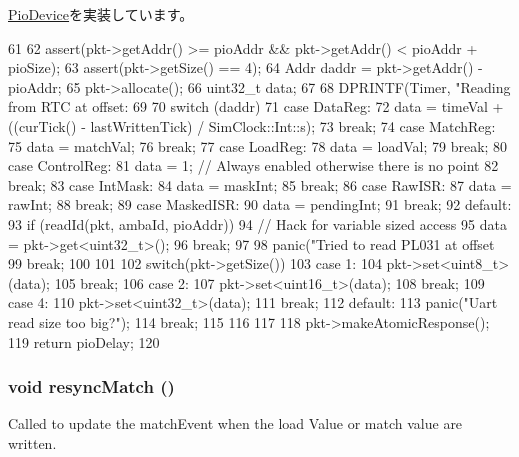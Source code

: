 \hyperlink{classPioDevice_a842312590432036092c422c87a442358}{PioDevice}を実装しています。


\begin{DoxyCode}
61 {
62     assert(pkt->getAddr() >= pioAddr && pkt->getAddr() < pioAddr + pioSize);
63     assert(pkt->getSize() == 4);
64     Addr daddr = pkt->getAddr() - pioAddr;
65     pkt->allocate();
66     uint32_t data;
67 
68     DPRINTF(Timer, "Reading from RTC at offset: %
69 
70     switch (daddr) {
71       case DataReg:
72         data = timeVal + ((curTick() - lastWrittenTick) / SimClock::Int::s);
73         break;
74       case MatchReg:
75         data = matchVal;
76         break;
77       case LoadReg:
78         data = loadVal;
79         break;
80       case ControlReg:
81         data = 1; // Always enabled otherwise there is no point
82         break;
83       case IntMask:
84         data = maskInt;
85         break;
86       case RawISR:
87         data = rawInt;
88         break;
89       case MaskedISR:
90         data = pendingInt;
91         break;
92       default:
93         if (readId(pkt, ambaId, pioAddr)) {
94             // Hack for variable sized access
95             data = pkt->get<uint32_t>();
96             break;
97         }
98         panic("Tried to read PL031 at offset %
99         break;
100     }
101 
102     switch(pkt->getSize()) {
103       case 1:
104         pkt->set<uint8_t>(data);
105         break;
106       case 2:
107         pkt->set<uint16_t>(data);
108         break;
109       case 4:
110         pkt->set<uint32_t>(data);
111         break;
112       default:
113         panic("Uart read size too big?\n");
114         break;
115     }
116 
117 
118     pkt->makeAtomicResponse();
119     return pioDelay;
120 }
\end{DoxyCode}
\hypertarget{classPL031_a156827b3ed8457dd136c7fb2043e204c}{
\subsubsection[{resyncMatch}]{\setlength{\rightskip}{0pt plus 5cm}void resyncMatch ()}}
\label{classPL031_a156827b3ed8457dd136c7fb2043e204c}
Called to update the matchEvent when the load Value or match value are written. 


